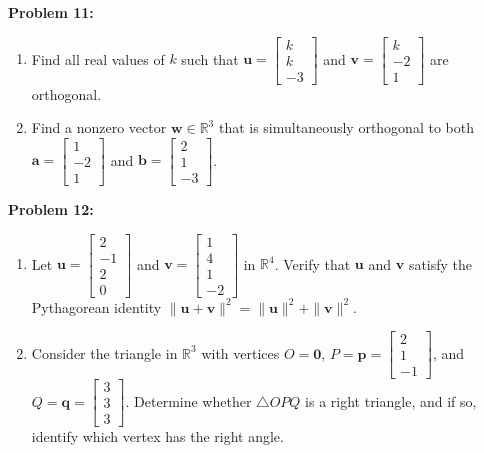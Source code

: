 \documentclass[11pt, letterpaper]{article}
\theoremstyle{definition}
\theoremstyle{remark}
\begin{document}
\textbf{Problem 11:}
\begin{enumerate}[label=(\alph*)]
    \item Find all real values of $k$ such that $\mathbf{u} = \begin{bmatrix} k \\ k \\ -3 \end{bmatrix}$ and $\mathbf{v} = \begin{bmatrix} k \\ -2 \\ 1 \end{bmatrix}$ are orthogonal.
    \item Find a nonzero vector $\mathbf{w} \in \mathbb{R}^3$ that is simultaneously orthogonal to both $\mathbf{a} = \begin{bmatrix} 1 \\ -2 \\ 1 \end{bmatrix}$ and $\mathbf{b} = \begin{bmatrix} 2 \\ 1 \\ -3 \end{bmatrix}$.
\end{enumerate}

\textbf{Problem 12:}
\begin{enumerate}[label=(\alph*)]
    \item Let $\mathbf{u} = \begin{bmatrix} 2 \\ -1 \\ 2 \\ 0 \end{bmatrix}$ and $\mathbf{v} = \begin{bmatrix} 1 \\ 4 \\ 1 \\ -2 \end{bmatrix}$ in $\mathbb{R}^4$. Verify that $\mathbf{u}$ and $\mathbf{v}$ satisfy the Pythagorean identity $\|\mathbf{u} + \mathbf{v}\|^2 = \|\mathbf{u}\|^2 + \|\mathbf{v}\|^2$.
    \item Consider the triangle in $\mathbb{R}^3$ with vertices $O = \mathbf{0}$, $P = \mathbf{p} = \begin{bmatrix} 2 \\ 1 \\ -1 \end{bmatrix}$, and $Q = \mathbf{q} = \begin{bmatrix} 3 \\ 3 \\ 3 \end{bmatrix}$. Determine whether $\triangle OPQ$ is a right triangle, and if so, identify which vertex has the right angle.
\end{enumerate}
\end{document}
